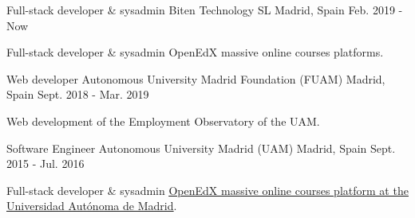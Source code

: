 

\begin{cventries}

  \cventry
    {Full-stack developer \& sysadmin} %
    {Biten Technology SL} %
    {Madrid, Spain} %
    {Feb. 2019 - Now} %
    {
      \begin{cvitems} %
		\item{Full-stack developer \& sysadmin OpenEdX massive online courses platforms.}
      \end{cvitems}
    }

  \cventry
    {Web developer} %
    {Autonomous University Madrid Foundation (FUAM)} %
    {Madrid, Spain} %
    {Sept. 2018 - Mar. 2019} %
    {
      \begin{cvitems} %
        \item {Web development of the Employment Observatory of the UAM.}
      \end{cvitems}
    }

  \cventry
    {Software Engineer} %
    {Autonomous University Madrid (UAM)} %
    {Madrid, Spain} %
    {Sept. 2015 - Jul. 2016} %
    {
      \begin{cvitems} %
        \item {Full-stack developer \& sysadmin \underline{\href{https://uamx.uam.es/}{OpenEdX massive online courses platform at the Universidad Autónoma de Madrid}}.}
      \end{cvitems}
    }
\end{cventries}
